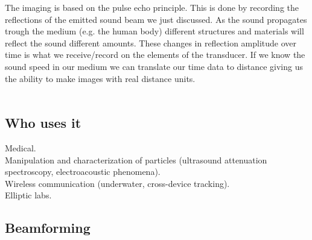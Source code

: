 \documentclass[12pt, a4paper, twoside, UKenglish]{article}
\begin{document}
The imaging is based on the pulse echo principle. This is done by recording the reflections of the emitted sound beam we just discussed. As the sound propagates trough the medium (e.g. the human body) different structures and materials will reflect the sound different amounts. These changes in reflection amplitude over time is what we receive/record on the elements of the transducer. If we know the sound speed in our medium we can translate our time data to distance giving us the ability to make images with real distance units.\\
\ \\

\subsection{Who uses it}
Medical.\\
Manipulation and characterization of particles (ultrasound attenuation spectroscopy, electroacoustic phenomena).\\
Wireless communication (underwater, cross-device tracking).\\
Elliptic labs.\\ 


\subsection{Beamforming}
\end{document}
